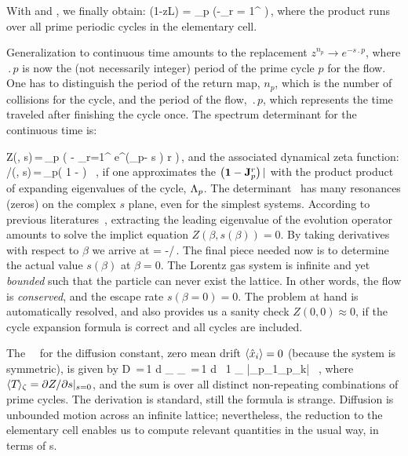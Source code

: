 With  and , we finally
obtain:
\beq
\det(1-z{\cal L}) = \prod_p \exp\left(-\sum_{r =
1}^{\infty}
\right)\,,
\label{eq-det-disc}
\eeq
where the product runs over all prime periodic cycles in the
elementary cell.

Generalization to continuous time amounts to the
replacement
$ z^{n_p} \rightarrow e^{-s \period{p}} $, where $\period{p}$
is now the (not necessarily integer)
period of the prime cycle $p$ for the flow. One has to distinguish the
period of the return map, $n_p$, which is the number of collisions for
the cycle, and the period of the flow, $\period{p}$, which represents
the time traveled after finishing the cycle once. The spectrum
determinant for the continuous time is:

\beq
Z(\beta, s)\,=\,\prod_{p\in\PP} \exp \left( - {
 \sum_{r=1}^
 { e^{(\beta \cdot \hn_p- s ) r } %
  }
 } \right)\,,
\label{eq-det-cont}
\eeq
and the associated dynamical zeta function:
/\zeta(\beta, s)\,=\,\prod_{p}\left( 1 -  \right) ~,
\label{eq-zeta-cont}
\eeq
if one approximates the $\left( {\bf 1}-{\bf J}_p^{r} \right) |$ with
the product product of expanding eigenvalues of the cycle,
$\Lambda_p$. The determinant~ has many resonances
(zeros) on the complex $s$ plane, even for the simplest systems.
According to previous literatures~, extracting the leading
eigenvalue of the evolution operator amounts to solve the implict
equation $Z(\beta, s(\beta)) = 0$. By taking derivatives with respect
to $\beta$ we arrive at
\beq
{} = -/\,.
\eeq
The final piece needed now is to determine the actual value $s(\beta)$
at $\beta = 0$. The Lorentz gas system is infinite and yet
\emph{bounded} such that the particle can never exist the lattice.
In other words, the flow is \emph{conserved}, and the escape rate
$s(\beta = 0) = 0$. The problem at hand is automatically resolved, and
also provides us a sanity check $Z(0, 0)\approx 0$, if the cycle
expansion formula is correct and all cycles are included.

The \dzeta\ \cycForm\ for the diffusion constant, zero mean drift
$ \langle { \hat{x}_i } \rangle = 0 $ (because the system is symmetric), is
given by
 \beq
 D \,=\,{1  d} { _\zeta \over
 \expct{\period{}}_\zeta } \,=\,{1  d } \, {1 \over
 \expct{\period{}}_\zeta} \sumprime {} {|\ExpaEig_{p_1}\cdots \ExpaEig_{p_k}|} \, ,
\label{eq-diff-ec}
\eeq
where $\langle {{\ensuremath{T_{}}}} \rangle_\zeta = \partial Z/\partial s\vert_{s = 0}$,
and the sum is over all distinct non-repeating combinations of prime
cycles. The derivation is standard, still the formula is strange.
Diffusion is unbounded motion across an infinite lattice;
nevertheless, the reduction to the elementary cell enables us to
compute relevant quantities in the usual way, in terms of \po s.
